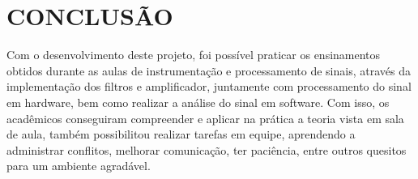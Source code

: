 \chapter{CONCLUSÃO}
Com o desenvolvimento deste projeto, foi possível praticar os ensinamentos obtidos durante as aulas de instrumentação e processamento de sinais, através da implementação dos filtros e amplificador, juntamente com processamento do sinal em hardware, bem como realizar a análise do sinal em software.
Com isso, os acadêmicos conseguiram compreender e aplicar na prática a teoria vista em sala de aula, também possibilitou realizar tarefas em equipe, aprendendo a administrar conflitos, melhorar comunicação, ter paciência, entre outros quesitos para um ambiente agradável.